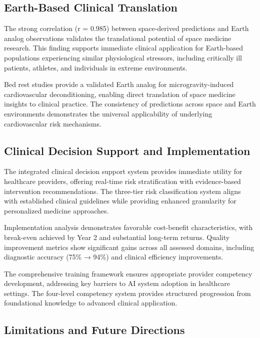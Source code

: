 \documentclass[11pt,a4paper]{article}
\begin{document}
\subsection{Earth-Based Clinical Translation}

The strong correlation (r = 0.985) between space-derived predictions and Earth analog observations validates the translational potential of space medicine research. This finding supports immediate clinical application for Earth-based populations experiencing similar physiological stressors, including critically ill patients, athletes, and individuals in extreme environments.

Bed rest studies provide a validated Earth analog for microgravity-induced cardiovascular deconditioning, enabling direct translation of space medicine insights to clinical practice. The consistency of predictions across space and Earth environments demonstrates the universal applicability of underlying cardiovascular risk mechanisms.

\subsection{Clinical Decision Support and Implementation}

The integrated clinical decision support system provides immediate utility for healthcare providers, offering real-time risk stratification with evidence-based intervention recommendations. The three-tier risk classification system aligns with established clinical guidelines while providing enhanced granularity for personalized medicine approaches.

Implementation analysis demonstrates favorable cost-benefit characteristics, with break-even achieved by Year 2 and substantial long-term returns. Quality improvement metrics show significant gains across all assessed domains, including diagnostic accuracy (75\% → 94\%) and clinical efficiency improvements.

The comprehensive training framework ensures appropriate provider competency development, addressing key barriers to AI system adoption in healthcare settings. The four-level competency system provides structured progression from foundational knowledge to advanced clinical application.

\subsection{Limitations and Future Directions}
\end{document}
